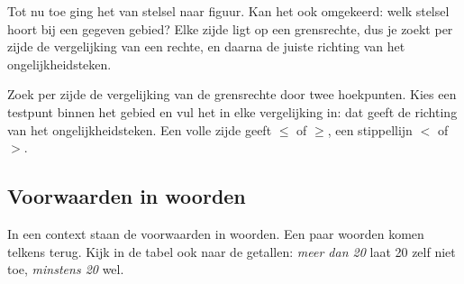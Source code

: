 Tot nu toe ging het van stelsel naar figuur. Kan het ook omgekeerd: welk stelsel hoort bij een gegeven gebied? Elke zijde ligt op een grensrechte, dus je zoekt per zijde de vergelijking van een rechte, en daarna de juiste richting van het ongelijkheidsteken.


\begin{werkwijze}
Zoek per zijde de vergelijking van de grensrechte door twee hoekpunten. Kies een testpunt binnen het gebied en vul het in elke vergelijking in: dat geeft de richting van het ongelijkheidsteken. Een volle zijde geeft $\leqslant$ of $\geqslant$, een stippellijn $<$ of $>$.
\end{werkwijze}

\begin{oefeningen}
\end{oefeningen}

\subsection{Voorwaarden in woorden}

In een context staan de voorwaarden in woorden. Een paar woorden komen telkens terug. Kijk in de tabel ook naar de getallen: \textit{meer dan 20} laat 20 zelf niet toe, \textit{minstens 20} wel.

